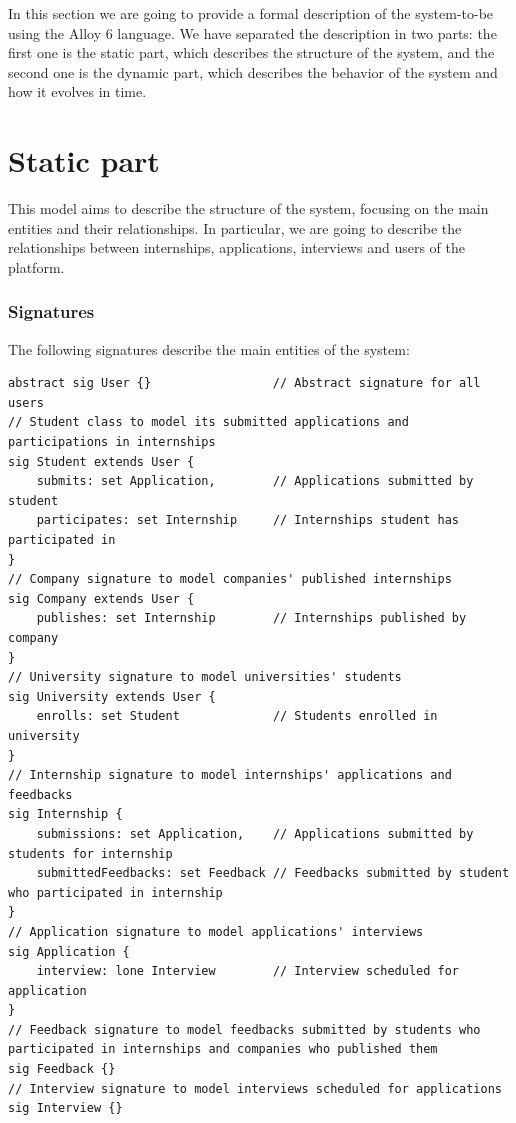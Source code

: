 In this section we are going to provide a formal description of the system-to-be using the Alloy 6 language. 
We have separated the description in two parts: the first one is the static part, which describes the structure of the system, and the second 
one is the dynamic part, which describes the behavior of the system and how it evolves in time.

\section{Static part}
This model aims to describe the structure of the system, focusing on the main entities and their relationships. In particular, we are going to 
describe the relationships between internships, applications, interviews and users of the platform.

\subsubsection{Signatures}
The following signatures describe the main entities of the system:
\begin{lstlisting}
abstract sig User {}                 // Abstract signature for all users
// Student class to model its submitted applications and participations in internships
sig Student extends User {           
    submits: set Application,        // Applications submitted by student
    participates: set Internship     // Internships student has participated in
}
// Company signature to model companies' published internships
sig Company extends User {
    publishes: set Internship        // Internships published by company
}
// University signature to model universities' students
sig University extends User {
    enrolls: set Student             // Students enrolled in university
}
// Internship signature to model internships' applications and feedbacks
sig Internship {
    submissions: set Application,    // Applications submitted by students for internship
    submittedFeedbacks: set Feedback // Feedbacks submitted by student who participated in internship
}               
// Application signature to model applications' interviews
sig Application {
    interview: lone Interview        // Interview scheduled for application
}
// Feedback signature to model feedbacks submitted by students who participated in internships and companies who published them
sig Feedback {}
// Interview signature to model interviews scheduled for applications
sig Interview {}
\end{lstlisting}

